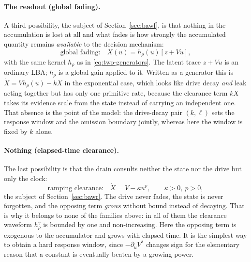 \documentclass[12pt]{article}
\theoremstyle{remark}
\begin{document}
\paragraph{The readout (global fading).} A third possibility, the subject of
Section~\ref{sec:bawf}, is that nothing in the accumulation is lost at all and what fades is how strongly the accumulated quantity remains \emph{available} to the decision mechanism:
\begin{equation}
  \text{global fading:}\quad
  X(u) = h_\rho(u)\left[z + Vu\right],
  \label{eq:bawf-gen}
\end{equation}
with the same kernel $h_\rho$ as in \eqref{eq:two-generators}. The latent trace $z+Vu$ is an ordinary LBA; $h_\rho$ is a global gain applied to it. Written as a generator this is $\dot X = Vh_\rho(u) - kX$ in the exponential case, which looks like drive decay \emph{and} leak acting together but has only one primitive rate, because the clearance term $kX$ takes its evidence scale from the state instead of carrying an independent one. That absence is the point of the model: the drive-decay pair $(k,\ell)$ sets the response window and the omission boundary jointly, whereas here the window is fixed by $k$ alone.

\paragraph{Nothing (elapsed-time clearance).} The last possibility is that the
drain consults neither the state nor the drive but only the clock:
\begin{equation}
  \text{ramping clearance:}\quad
  \dot X = V - \kappa u^{p},
  \qquad \kappa > 0,\ p > 0,
  \label{eq:bawr-gen}
\end{equation}
the subject of Section~\ref{sec:bawr}. The drive never fades, the state is never forgotten, and the opposing term \emph{grows} without bound instead of decaying. That is why it belongs to none of the families above: in all of them the clearance waveform $h_\rho^\gamma$ is bounded by one and non-increasing. Here the opposing term is exogenous to the accumulator and grows with elapsed time. It is the simplest way to obtain a hard response window, since $-\partial_u V^{*}$ changes sign for the elementary reason that a constant is eventually beaten by a growing power.
\end{document}
